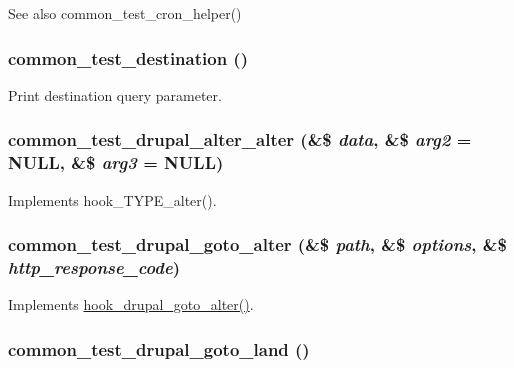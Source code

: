 \begin{DoxySeeAlso}{See also}
common\_\-test\_\-cron\_\-helper() 
\end{DoxySeeAlso}
\hypertarget{common__test_8module_a841ae04a545f50898da19cf111cc2677}{
\subsubsection[{common\_\-test\_\-destination}]{\setlength{\rightskip}{0pt plus 5cm}common\_\-test\_\-destination ()}}
\label{common__test_8module_a841ae04a545f50898da19cf111cc2677}
Print destination query parameter. \hypertarget{common__test_8module_a47684f53dbcdd2a299c3e9fa834fe7d7}{
\subsubsection[{common\_\-test\_\-drupal\_\-alter\_\-alter}]{\setlength{\rightskip}{0pt plus 5cm}common\_\-test\_\-drupal\_\-alter\_\-alter (\&\$ {\em data}, \/  \&\$ {\em arg2} = {\ttfamily NULL}, \/  \&\$ {\em arg3} = {\ttfamily NULL})}}
\label{common__test_8module_a47684f53dbcdd2a299c3e9fa834fe7d7}
Implements hook\_\-TYPE\_\-alter(). \hypertarget{common__test_8module_ac2b8ae30fce12c338d3a688cc44a0f31}{
\subsubsection[{common\_\-test\_\-drupal\_\-goto\_\-alter}]{\setlength{\rightskip}{0pt plus 5cm}common\_\-test\_\-drupal\_\-goto\_\-alter (\&\$ {\em path}, \/  \&\$ {\em options}, \/  \&\$ {\em http\_\-response\_\-code})}}
\label{common__test_8module_ac2b8ae30fce12c338d3a688cc44a0f31}
Implements \hyperlink{group__hooks_ga3c043f34f18e1c77daa341038a28e1ba}{hook\_\-drupal\_\-goto\_\-alter()}. \hypertarget{common__test_8module_a51a37e16cde782af5f1ef1fcb0bd17be}{
\subsubsection[{common\_\-test\_\-drupal\_\-goto\_\-land}]{\setlength{\rightskip}{0pt plus 5cm}common\_\-test\_\-drupal\_\-goto\_\-land ()}}
